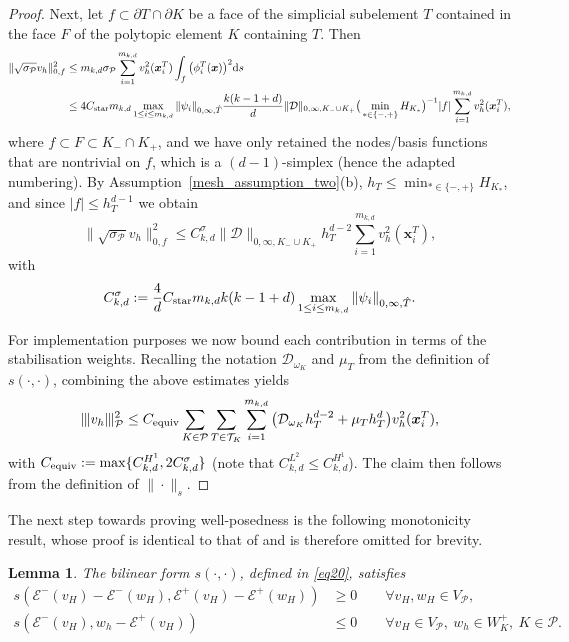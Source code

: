 \documentclass[11pt,final]{amsart}
\theoremstyle{plain}
\newtheorem{lemma}[theorem]{Lemma}
\theoremstyle{definition}
\newcommand\bx{\boldsymbol{x}}
\newcommand\calP{{\mathcal{P}}}
\newcommand\calT{{\mathcal{T}}}
\newcommand{\mesh}{\calP}
\newcommand{\ndgp}[1]{| \kern -.25mm \|{#1}| \kern -.25mm \|_{\rm \mesh}}
\renewcommand{\k}{K}
\begin{document}
\begin{proof}
Next, let $f\subset \partial T\cap\partial K$ be a face of the
simplicial subelement $T$ contained in the face $F$ of the polytopic
element $K$ containing $T$. Then
\[
\begin{aligned}
\|\sqrt{\sigma_\calP} v_h\|_{0,f}^2
&\le m_{k,d} \sigma_\calP \sum_{i=1}^{m_{k,d}} v_h^2(\bx_i^T)
    \int_f \big(\phi_i^T(\bx)\big)^2 \mathrm{d}s\\
&\le 4 C_{\rm star} m_{k,d} \max_{1\le i\le m_{k,d}}\|\psi_i\|_{0,\infty,\hat T} 
    \frac{k(k-1+d)}{d} 
    \|\mathcal{D}\|_{0,\infty,K_-\cup K_+} 
    \big(\min_{*\in\{-,+\}} H_{\k_*}\big)^{-1} |f| 
    \sum_{i=1}^{m_{k,d}} v_h^2(\bx_i^T),
\end{aligned}
\]
where $f\subset F\subset K_-\cap K_+$, and we have only retained the
nodes/basis functions that are nontrivial on $f$, which is a
$(d-1)$-simplex (hence the adapted numbering). By
Assumption~\ref{mesh_assumption_two}(b), $h_T\le \min_{*\in\{-,+\}}
H_{\k_*}$, and since $|f|\le h_T^{d-1}$ we obtain
\begin{equation}\label{pen_stab}
  \|\sqrt{\sigma_\calP} v_h\|_{0,f}^2
   \le 
  C_{k,d}^{\sigma} \|\mathcal{D}\|_{0,\infty,K_-\cup K_+} h_T^{d-2}
  \sum_{i=1}^{m_{k,d}} v_h^2(\bx_i^T),
\end{equation}
with
\[
C_{k,d}^{\sigma}:= \frac{4}{d} C_{\rm star} m_{k,d} k(k-1+d) 
                   \max_{1\le i\le m_{k,d}}\|\psi_i\|_{0,\infty,\hat T}.
\]

For implementation purposes we now bound each contribution in terms of
the stabilisation weights. Recalling the notation
$\mathcal{D}_{\omega_\k}$ and $\mu_T$ from the definition of
$s(\cdot,\cdot)$, combining the above estimates yields
\[
\ndgp{ v_{h}}^{2}
 \le 
C_{\rm equiv}\sum_{\k\in\mesh}\sum_{T\in\calT_\k}\sum_{i=1}^{m_{k,d}}
\big(\mathcal{D}_{\omega_\k} h_T^{d-2}+\mu_T h_T^{d}\big) v_h^2(\bx_i^T),
\]
with $C_{\rm equiv}:=\max\{C_{k,d}^{H^1}, 2 C_{k,d}^{\sigma}\}$ (note
that $C_{k,d}^{L^2}\le C_{k,d}^{H^1}$). The claim then follows from
the definition of $\|\cdot\|_{s}$.
\end{proof}

The next step towards proving well-posedness is the following
monotonicity result, whose proof is identical to that of
\cite[Lemma~3.1]{BGPV24} and is therefore omitted for brevity.

\begin{lemma}\label{l31}
The bilinear form $s(\cdot,\cdot)$, defined in \eqref{eq20}, satisfies
\begin{align}
  s(\mathcal{E}^{-}(v_{H})-\mathcal{E}^{-}(w_{H}),
    \mathcal{E}^{+}(v_{H})-\mathcal{E}^{+}(w_{H}))
  &\geq 0 \qquad \forall v_{H},w_{H} \in V_{\mathcal{P}}, \label{eq23}\\[0.5em]
  s(\mathcal{E}^{-}(v_{H}),w_{h}-\mathcal{E}^{+}(v_{H}))
  &\leq 0 \qquad \forall v_{H} \in V_{\mathcal{P}},\ 
     w_{h} \in W_\k^+,\ \k\in\mesh. \label{eq24}
\end{align}
\end{lemma}
\end{document}
